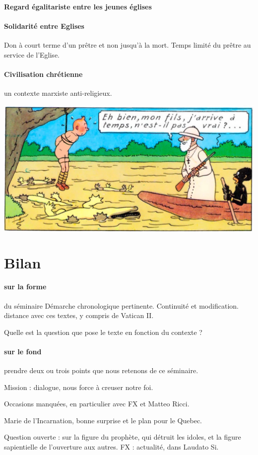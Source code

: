  \paragraph{Regard égalitariste entre les jeunes églises} 

 \paragraph{Solidarité entre Eglises} Don à court terme d'un prêtre et non jusqu'à la mort. Temps limité du prêtre au service de l'Eglise. 

\paragraph{Civilisation chrétienne}


un contexte marxiste anti-religieux.


  \includegraphics[width=\textwidth]{SeminaireMission/images/TintinCongo3.jpg}  


 
\section{Bilan}

\paragraph{sur la forme} du séminaire
Démarche chronologique pertinente. Continuité et modification.
distance avec ces textes, y compris de Vatican II.


Quelle est la question que pose le texte en fonction du contexte ?

\paragraph{sur le fond} prendre deux ou trois points que nous retenons de ce séminaire.

Mission : dialogue, nous force à creuser notre foi.

Occasions manquées, en particulier avec FX et Matteo Ricci.

Marie de l'Incarnation, bonne surprise et le plan pour le Quebec.

Question ouverte : sur la figure du prophète, qui détruit les idoles, et la figure sapientielle de l'ouverture aux autres. FX : actualité, dans Laudato Si.  






